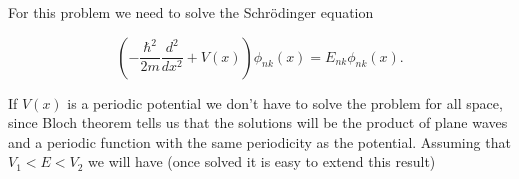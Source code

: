 
\begin{questions}
\begin{solution}
  For this problem we need to solve the Schrödinger equation

  \begin{equation}
    \left(-\frac{\hbar^2}{2m}\frac{d^2}{dx^2} + V(x)\right)\phi_{nk}(x) = E_{nk}\phi_{nk}(x).
  \end{equation}

  If $V(x)$ is a periodic potential we don't have to solve the problem for all space, since Bloch theorem tells us that the solutions will be the product of plane waves and a periodic function with the same periodicity as the potential. Assuming that $V_1<E<V_2$ we will have (once solved it is easy to extend this result)


\end{solution}
\end{questions}
